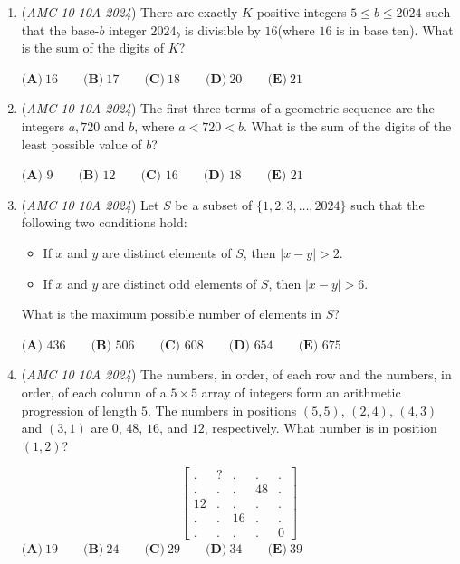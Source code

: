 \begin{enumerate}
 $\textbf{(A)}~10\qquad\textbf{(B)}~11\qquad\textbf{(C)}~12\qquad\textbf{(D)}~13\qquad\textbf{(E)}~14$


	\item (\textit{AMC 10 10A 2024}) There are exactly $K$ positive integers $5 \leq b \leq 2024$ such that the base-$b$ integer $2024_{b}$ is divisible by $16$(where $16$ is in base ten). What is the sum of the digits of $K$?


 $\textbf{(A)}~16\qquad\textbf{(B)}~17\qquad\textbf{(C)}~18\qquad\textbf{(D)}~20\qquad\textbf{(E)}~21$


	\item (\textit{AMC 10 10A 2024}) The first three terms of a geometric sequence are the integers $a, 720$ and $b$, where $a < 720 < b$. What is the sum of the digits of the least possible value of $b$?


 $\textbf{(A) } 9\qquad\textbf{(B) } 12\qquad\textbf{(C) } 16\qquad\textbf{(D) } 18\qquad\textbf{(E) } 21$


	\item (\textit{AMC 10 10A 2024}) Let $S$ be a subset of $\{1, 2, 3, \dots, 2024\}$ such that the following two conditions hold:


 
            \begin{itemize}
        \item If $x$ and $y$ are distinct elements of $S$, then $|x-y| > 2.$
            \end{itemize}
            
            \begin{itemize}
        \item If $x$ and $y$ are distinct odd elements of $S$, then $|x-y| > 6.$
            \end{itemize}
            What is the maximum possible number of elements in $S$?


 $\textbf{(A) }436 \qquad \textbf{(B) }506 \qquad \textbf{(C) }608 \qquad \textbf{(D) }654 \qquad \textbf{(E) }675$


	\item (\textit{AMC 10 10A 2024}) The numbers, in order, of each row and the numbers, in order, of each column of a $5 \times 5$ array of integers form an arithmetic progression of length $5$. The numbers in positions $(5, 5)$, $(2, 4)$, $(4, 3)$ and $(3, 1)$ are $0$, $48$, $16$, and $12$, respectively. What number is in position $(1, 2)$?

 \[\begin{bmatrix} . & ? &.&.&. \\ .&.&.&48&.\\ 12&.&.&.&.\\ .&.&16&.&.\\ .&.&.&.&0\end{bmatrix}\]
$\textbf{(A)}~19\qquad\textbf{(B)}~24\qquad\textbf{(C)}~29\qquad\textbf{(D)}~34\qquad\textbf{(E)}~39$



\end{enumerate}
